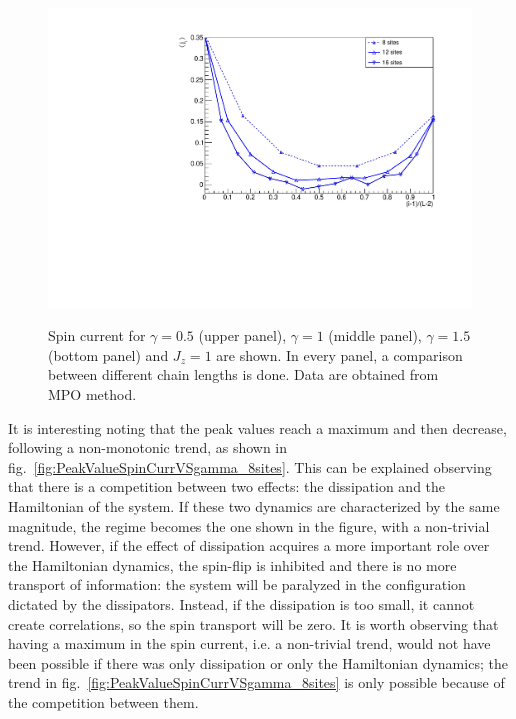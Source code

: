 \begin{figure}[H]
    \includegraphics[scale=0.55]{Figures/spinCurrVSsize_Gamma15.pdf}
    \label{fig:16sites_LMvsGamma}
\captionsetup{width=1.\linewidth}
\caption{Spin current for $\gamma = 0.5$ (upper panel), $\gamma = 1$ (middle panel), $\gamma = 1.5$ (bottom panel) and $J_z = 1$ are shown. In every panel, a comparison between different chain lengths is done. Data are obtained from MPO method.}
\label{fig:spinCurrVSsizeVSgamma}
\end{figure}

It is interesting noting that the peak values reach a maximum and then decrease, following a non-monotonic trend, as shown in fig.~\ref{fig:PeakValueSpinCurrVSgamma_8sites}. This can be explained observing that there is a competition between two effects: the dissipation and the Hamiltonian of the system. If these two dynamics are characterized by the same magnitude, the regime becomes the one shown in the figure, with a non-trivial trend. However, if the effect of dissipation acquires a more important role over the Hamiltonian dynamics, the spin-flip is inhibited and there is no more transport of information: the system will be paralyzed in the configuration dictated by the dissipators. Instead, if the dissipation is too small, it cannot create correlations, so the spin transport will be zero. It is worth observing that having a maximum in the spin current, i.e. a non-trivial trend, would not have been possible if there was only dissipation or only the Hamiltonian dynamics; the trend in fig.~\ref{fig:PeakValueSpinCurrVSgamma_8sites} is only possible because of the competition between them.


